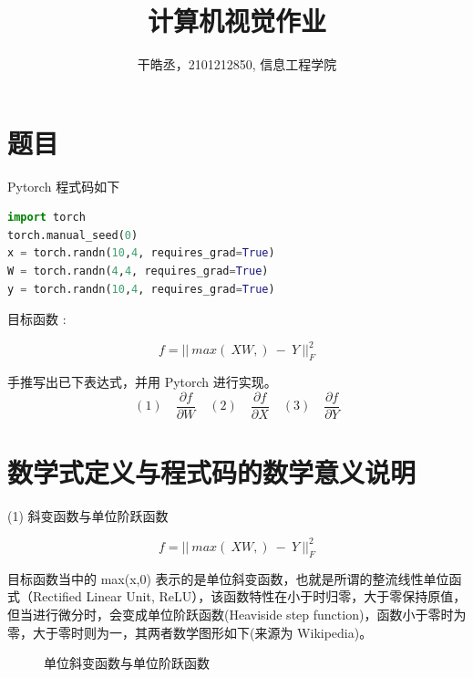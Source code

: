 \documentclass[11pt,UTF8]{ctexart}
\title{计算机视觉作业}
\author{干皓丞，2101212850, 信息工程学院}
\begin{document}
\maketitle


\section{题目}

Pytorch 程式码如下
\\
	\begin{lstlisting}[language={python}]
import torch
torch.manual_seed(0)
x = torch.randn(10,4, requires_grad=True)
W = torch.randn(4,4, requires_grad=True)
y = torch.randn(10,4, requires_grad=True)
	\end{lstlisting}


目标函数 :

$$f={||\ max(\ XW,)\ -\ Y\ ||}_F^2$$

手推写出已下表达式，并用 Pytorch 进行实现。
$$ (1)\quad \frac{\partial f}{\partial W}  \quad (2)\quad \frac{\partial f}{\partial X} \quad (3)\quad \frac{\partial f}{\partial Y}$$

\section{数学式定义与程式码的数学意义说明}

(1) 斜变函数与单位阶跃函数

$$f={||\ max(\ XW,)\ -\ Y\ ||}_F^2$$

目标函数当中的 max(x,0) 表示的是单位斜变函数，也就是所谓的整流线性单位函式（Rectified Linear Unit, ReLU），该函数特性在小于时归零，大于零保持原值，但当进行微分时，会变成单位阶跃函数(Heaviside step function)，函数小于零时为零，大于零时则为一，其两者数学图形如下(来源为 Wikipedia)。

\begin{figure}[H]
\centering  %
\caption{单位斜变函数与单位阶跃函数}
\label{Fig.main}
\end{figure}
\end{document}
